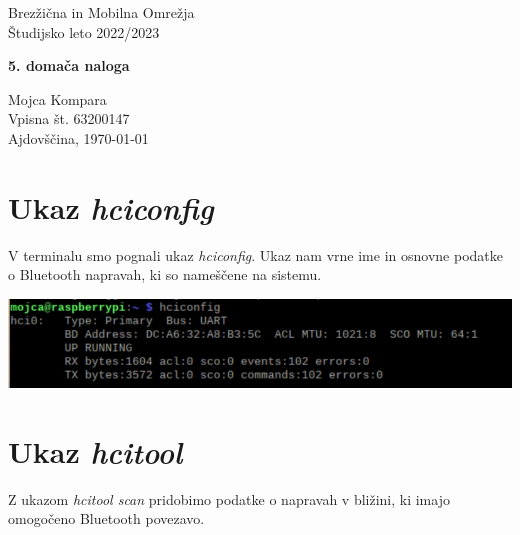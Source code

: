 \documentclass[11pt,a4paper,slovene]{article}
\begin{document}
\label{naslov}
\thispagestyle{empty}

\begin{center}
\begin{Large}
Brez\v{z}i\v{c}na in Mobilna Omre\v{z}ja\\
Študijsko leto 2022/2023\\
\end{Large}

\vspace*{4cm}
\begin{LARGE}
\textbf{5. domača naloga\\}
\end{LARGE}
\vspace*{0.5cm}

\begin{Large}

\vspace*{4cm}

Mojca Kompara\\
Vpisna št. 63200147\\

\vspace*{5cm}
Ajdovščina, \today
\end{Large}
\end{center}

\pagebreak
\setcounter{page}{1}


\label{Kazalo}
\tableofcontents
\thispagestyle{empty}
\pagebreak

\section{Ukaz \textit{hciconfig}}
V terminalu smo pognali ukaz \textit{hciconfig}. Ukaz nam vrne ime in osnovne podatke o Bluetooth napravah, ki so nameščene na sistemu.

\includegraphics[width=\textwidth]{hciconfig}

\section{Ukaz \textit{hcitool}}
Z ukazom \textit{hcitool scan} pridobimo podatke o napravah v bližini, ki imajo omogočeno Bluetooth povezavo.
\end{document}
